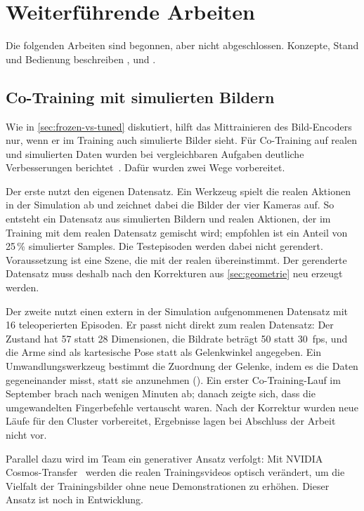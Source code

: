 
\chapter{Weiterführende Arbeiten}
\label{chap:weiterfuehrend}

Die folgenden Arbeiten sind begonnen, aber nicht abgeschlossen. Konzepte,
Stand und Bedienung beschreiben ,
 und .

\section{Co-Training mit simulierten Bildern}
\label{sec:cotrain}

Wie in \cref{sec:frozen-vs-tuned} diskutiert, hilft das Mittrainieren des
Bild-Encoders nur, wenn er im Training auch simulierte Bilder sieht. Für
Co-Training auf realen und simulierten Daten wurden bei vergleichbaren
Aufgaben deutliche Verbesserungen berichtet~\cite{cotrain2025}. Dafür wurden
zwei Wege vorbereitet.

Der erste nutzt den eigenen Datensatz. Ein Werkzeug spielt die realen
Aktionen in der Simulation ab und zeichnet dabei die Bilder der vier Kameras
auf. So entsteht ein Datensatz aus simulierten Bildern und realen Aktionen,
der im Training mit dem realen Datensatz gemischt wird; empfohlen ist ein
Anteil von 25\,\% simulierter Samples. Die Testepisoden werden dabei nicht
gerendert. Voraussetzung ist eine Szene, die mit der realen übereinstimmt.
Der gerenderte Datensatz muss deshalb nach den Korrekturen aus
\cref{sec:geometrie} neu erzeugt werden.

Der zweite nutzt einen extern in der Simulation aufgenommenen Datensatz mit
16 teleoperierten Episoden. Er passt nicht direkt zum realen Datensatz: Der
Zustand hat 57 statt 28 Dimensionen, die Bildrate beträgt 50 statt 30~fps, und
die Arme sind als kartesische Pose statt als Gelenkwinkel angegeben. Ein
Umwandlungswerkzeug bestimmt die Zuordnung der Gelenke, indem es die Daten
gegeneinander misst, statt sie anzunehmen ().
Ein erster Co-Training-Lauf im September brach nach wenigen Minuten ab;
danach zeigte sich, dass die umgewandelten Fingerbefehle vertauscht waren.
Nach der Korrektur wurden neue Läufe für den Cluster vorbereitet, Ergebnisse
lagen bei Abschluss der Arbeit nicht vor.

Parallel dazu wird im Team ein generativer Ansatz verfolgt: Mit NVIDIA
Cosmos-Transfer~\cite{cosmostransfer2025} werden die realen Trainingsvideos
optisch verändert, um die Vielfalt der Trainingsbilder ohne neue
Demonstrationen zu erhöhen. Dieser Ansatz ist noch in Entwicklung.

